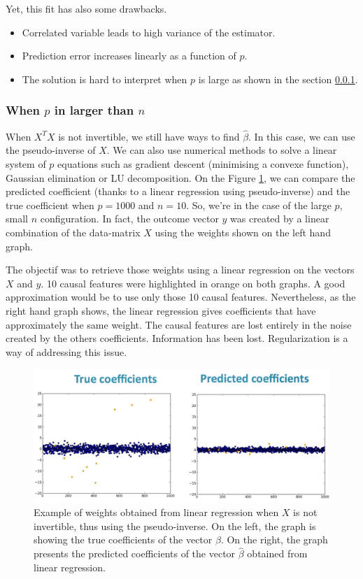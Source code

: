 \documentclass[a4paper,12pt]{article}
\begin{document}
Yet, this fit has also some drawbacks.
\begin{itemize}
\item Correlated variable leads to high variance of the estimator.
\item Prediction error increases linearly as a function of $p$.
\item The solution is hard to interpret when $p$ is large as shown in the section \ref{LargeP}.
\end{itemize}

\subsubsection{When $p$ in larger than $n$}
\label{LargeP}
When $X^T X$ is not invertible, we still have ways to find $\hat{\beta}$. In this case, we can use the pseudo-inverse of $X$. We can also use numerical methods to solve a linear system of $p$ equations such as gradient descent (minimising a convexe function), Gaussian elimination or LU decomposition.
On the Figure \ref{LRPseudoInverse}, we can compare the predicted coefficient (thanks to a linear regression using pseudo-inverse) and the true coefficient when $p = 1000$ and $n = 10$. So, we're in the case of the large $p$, small $n$ configuration. In fact, the outcome vector $y$ was created by a linear combination of the data-matrix $X$ using the weights shown on the left hand graph. 

The objectif was to retrieve those weights using a linear regression on the vectors $X$ and $y$. 10 causal features were highlighted in orange on both graphs. A good approximation would be to use only those 10 causal features. Nevertheless, as the right hand graph shows, the linear regression gives coefficients that have approximately the same weight. The causal features are lost entirely in the noise created by the others coefficients. Information has been lost. Regularization is a way of addressing this issue.

\begin{figure}[!h]
\centerline{
\includegraphics[scale = 0.3]{Figures/linear_regression_pseudoinverse.png}}
\caption{Example of weights obtained from linear regression when $X$ is not invertible, thus using the pseudo-inverse. On the left, the graph is showing the true coefficients of the vector $\beta$. On the right, the graph presents the predicted coefficients of the vector $\hat{\beta}$ obtained from linear regression.}
\label{LRPseudoInverse}
\end{figure}
\end{document}
